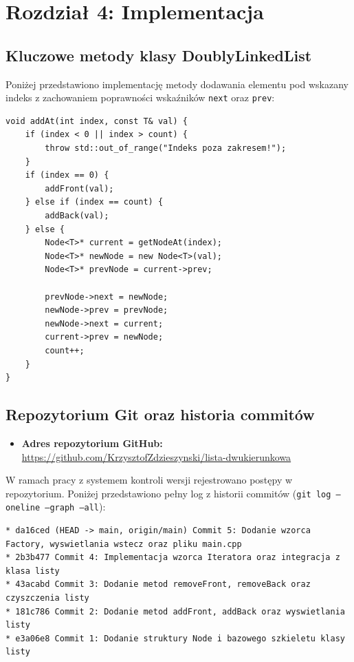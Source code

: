 \section{Rozdział 4: Implementacja}

\subsection{Kluczowe metody klasy DoublyLinkedList}
Poniżej przedstawiono implementację metody dodawania elementu pod wskazany indeks z zachowaniem poprawności wskaźników \texttt{next} oraz \texttt{prev}:

\begin{lstlisting}[caption={Dodawanie elementu pod podany indeks}]
void addAt(int index, const T& val) {
    if (index < 0 || index > count) {
        throw std::out_of_range("Indeks poza zakresem!");
    }
    if (index == 0) {
        addFront(val);
    } else if (index == count) {
        addBack(val);
    } else {
        Node<T>* current = getNodeAt(index);
        Node<T>* newNode = new Node<T>(val);
        Node<T>* prevNode = current->prev;

        prevNode->next = newNode;
        newNode->prev = prevNode;
        newNode->next = current;
        current->prev = newNode;
        count++;
    }
}
\end{lstlisting}

\subsection{Repozytorium Git oraz historia commitów}
\begin{itemize}
    \item \textbf{Adres repozytorium GitHub:} \url{https://github.com/KrzysztofZdzieszynski/lista-dwukierunkowa}
\end{itemize}

W ramach pracy z systemem kontroli wersji rejestrowano postępy w repozytorium. Poniżej przedstawiono pełny log z historii commitów (\texttt{git log --oneline --graph --all}):

\begin{lstlisting}[caption={Rzeczywista historia commitów z systemu Git}]
* da16ced (HEAD -> main, origin/main) Commit 5: Dodanie wzorca Factory, wyswietlania wstecz oraz pliku main.cpp
* 2b3b477 Commit 4: Implementacja wzorca Iteratora oraz integracja z klasa listy
* 43acabd Commit 3: Dodanie metod removeFront, removeBack oraz czyszczenia listy
* 181c786 Commit 2: Dodanie metod addFront, addBack oraz wyswietlania listy
* e3a06e8 Commit 1: Dodanie struktury Node i bazowego szkieletu klasy listy
\end{lstlisting}

